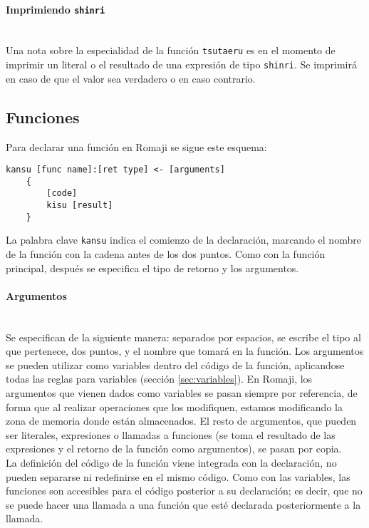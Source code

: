 \documentclass[spanish]{article}
\begin{document}
\paragraph{Imprimiendo \texttt{shinri}}\hspace{0pt} \\
Una nota sobre la especialidad de la función \texttt{tsutaeru} es en el momento de imprimir un literal o el resultado de una expresión de tipo \texttt{shinri}. Se imprimirá  en caso de que el valor sea verdadero o  en caso contrario.


\subsection{Funciones}
\label{sec:funciones}

Para declarar una función en Romaji se sigue este esquema:

\begin{lstlisting}[language=Romaji]
    kansu [func name]:[ret type] <- [arguments]
    {
        [code]
        kisu [result]
    }
\end{lstlisting}

La palabra clave \texttt{kansu} indica el comienzo de la declaración, marcando el nombre de la función con la cadena antes de los dos puntos. Como con la función principal, después se especifica el tipo de retorno y los argumentos.
\paragraph{Argumentos} \hspace{0pt} \\
Se especifican de la siguiente manera: separados por espacios, se escribe el tipo al que pertenece, dos puntos, y el nombre que tomará en la función. Los argumentos se pueden utilizar como variables dentro del código de la función, aplicandose todas las reglas para variables (sección \ref{sec:variables}).
En Romaji, los argumentos que vienen dados como variables se pasan siempre por referencia, de forma que al realizar operaciones que los modifiquen, estamos modificando la zona de memoria donde están almacenados. El resto de argumentos, que pueden ser literales, expresiones o llamadas a funciones (se toma el resultado de las expresiones y el retorno de la función como argumentos), se pasan por copia.\\

La definición del código de la función viene integrada con la declaración, no pueden separarse ni redefinirse en el mismo código. Como con las variables, las funciones son accesibles para el código posterior a su declaración; es decir, que no se puede hacer una llamada a una función que esté declarada posteriormente a la llamada.\\
\end{document}
